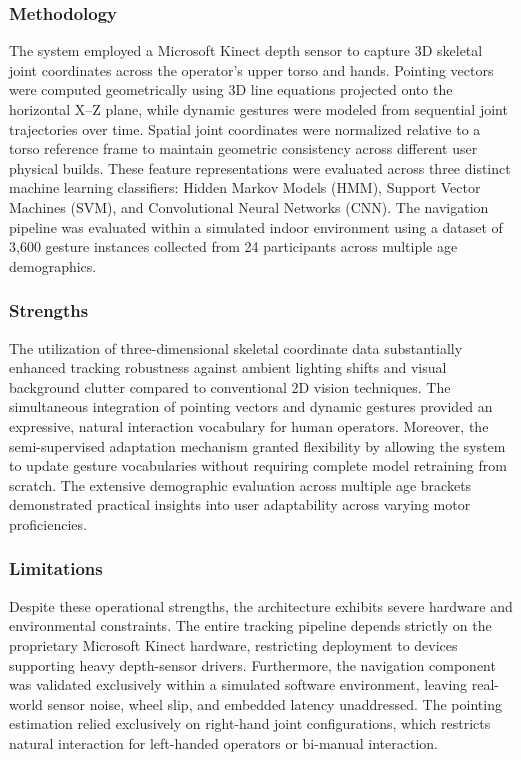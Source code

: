 \subsubsection{Methodology}
The system employed a Microsoft Kinect depth sensor to capture 3D skeletal joint coordinates across the operator's upper torso and hands. Pointing vectors were computed geometrically using 3D line equations projected onto the horizontal X--Z plane, while dynamic gestures were modeled from sequential joint trajectories over time. Spatial joint coordinates were normalized relative to a torso reference frame to maintain geometric consistency across different user physical builds. These feature representations were evaluated across three distinct machine learning classifiers: Hidden Markov Models (HMM), Support Vector Machines (SVM), and Convolutional Neural Networks (CNN). The navigation pipeline was evaluated within a simulated indoor environment using a dataset of 3,600 gesture instances collected from 24 participants across multiple age demographics.

\subsubsection{Strengths}
The utilization of three-dimensional skeletal coordinate data substantially enhanced tracking robustness against ambient lighting shifts and visual background clutter compared to conventional 2D vision techniques. The simultaneous integration of pointing vectors and dynamic gestures provided an expressive, natural interaction vocabulary for human operators. Moreover, the semi-supervised adaptation mechanism granted flexibility by allowing the system to update gesture vocabularies without requiring complete model retraining from scratch. The extensive demographic evaluation across multiple age brackets demonstrated practical insights into user adaptability across varying motor proficiencies.

\subsubsection{Limitations}
Despite these operational strengths, the architecture exhibits severe hardware and environmental constraints. The entire tracking pipeline depends strictly on the proprietary Microsoft Kinect hardware, restricting deployment to devices supporting heavy depth-sensor drivers. Furthermore, the navigation component was validated exclusively within a simulated software environment, leaving real-world sensor noise, wheel slip, and embedded latency unaddressed. The pointing estimation relied exclusively on right-hand joint configurations, which restricts natural interaction for left-handed operators or bi-manual interaction.

